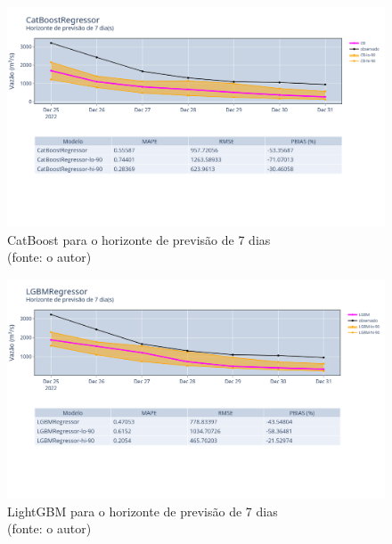 \begin{figure}[!h]
	\centering
	\includegraphics[scale=0.33]{Figuras/jequiti/resultados/CatBoostRegressor_fh7.png}
	\caption{CatBoost para o horizonte de previsão de 7 dias\\(fonte: o autor)}
	\label{fig:jequiti_CatBoostRegressor_fh7}
\end{figure}

\begin{figure}[!h]
	\centering
	\includegraphics[scale=0.33]{Figuras/jequiti/resultados/LGBMRegressor_fh7.png}
	\caption{LightGBM para o horizonte de previsão de 7 dias\\(fonte: o autor)}
	\label{fig:jequiti_LGBMRegressor_fh7}
\end{figure}

